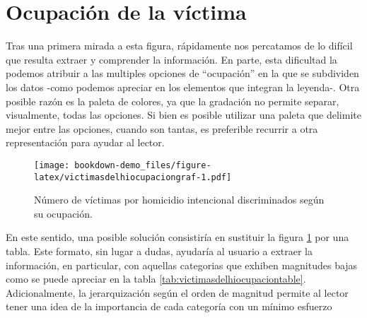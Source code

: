 \documentclass[
]{book}
\begin{document}
\hypertarget{ocupaciuxf3n-de-la-vuxedctima-1}{%
\section{Ocupación de la víctima}\label{ocupaciuxf3n-de-la-vuxedctima-1}}

Tras una primera mirada a esta figura, rápidamente nos percatamos de lo difícil que resulta extraer y comprender la información. En parte, esta dificultad la podemos atribuir a las multiples opciones de ``ocupación'' en la que se subdividen los datos -como podemos apreciar en los elementos que integran la leyenda-. Otra posible razón es la paleta de colores, ya que la gradación no permite separar, visualmente, todas las opciones. Si bien es posible utilizar una paleta que delimite mejor entre las opciones, cuando son tantas, es preferible recurrir a otra representación para ayudar al lector.



\begin{figure}
\centering
\texttt{[image: bookdown-demo\_files/figure-latex/victimasdelhiocupaciongraf-1.pdf]}
\caption{\label{fig:victimasdelhiocupaciongraf}Número de víctimas por homicidio intencional discriminados según su ocupación.}
\end{figure}

En este sentido, una posible solución consistiría en sustituir la figura \ref{fig:victimasdelhiocupaciongraf} por una tabla. Este formato, sin lugar a dudas, ayudaría al usuario a extraer la información, en particular, con aquellas categorias que exhiben magnitudes bajas como se puede apreciar en la tabla \ref{tab:victimasdelhiocupaciontable}. Adicionalmente, la jerarquización según el orden de magnitud permite al lector tener una idea de la importancia de cada categoría con un mínimo esfuerzo
\end{document}
